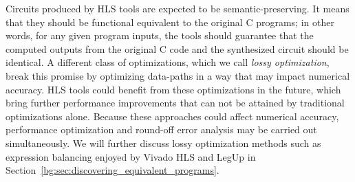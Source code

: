 Circuits produced by HLS tools are expected to be semantic-preserving.  It
means that they should be functional equivalent to the original C programs; in
other words, for any given program inputs, the tools should guarantee that the
computed outputs from the original C code and the synthesized circuit should
be identical.  A different class of optimizations, which we call \emph{lossy
optimization}, break this promise by optimizing data-paths in a way that may
impact numerical accuracy.  HLS tools could benefit from these optimizations
in the future, which bring further performance improvements that can not
be attained by traditional optimizations alone.  Because these approaches
could affect numerical accuracy, performance optimization and round-off error
analysis may be carried out simultaneously.  We will further discuss lossy
optimization methods such as expression balancing enjoyed by Vivado HLS and
LegUp in Section~\ref{bg:sec:discovering_equivalent_programs}.
